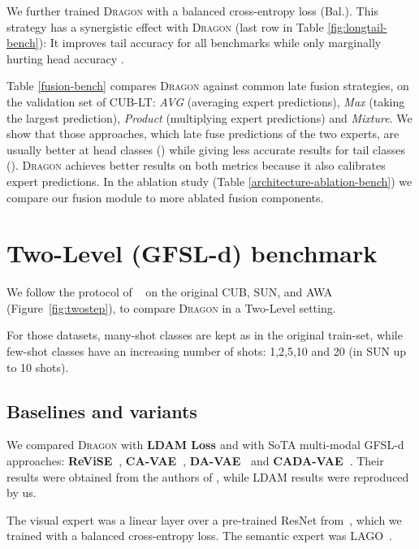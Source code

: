\documentclass[10pt,twocolumn,letterpaper]{article}
\newcommand{\figref}[1]{Figure~\ref{#1}}
\newcommand{\DRAGON}{\textsc{Dragon}}
\newcommand{\TwoLevel}{Two-Level}
\begin{document}
We further trained \DRAGON{} with a balanced cross-entropy loss (Bal.). This strategy has a synergistic effect with \DRAGON{} (last row in Table \ref{fig:longtail-bench}): It improves tail accuracy  for all benchmarks while only marginally hurting head accuracy .
 
Table \ref{fusion-bench}  compares \DRAGON{} against common late fusion strategies, on the validation set of CUB-LT:  \textit{AVG} (averaging expert predictions), \textit{Max} (taking the largest prediction), \textit{Product} (multiplying expert predictions) and \textit{Mixture}.
We show that those approaches, which late fuse predictions of the two experts, are usually better at head classes () while giving less accurate results for tail classes (). \DRAGON{} achieves better results on both metrics because it also calibrates expert predictions. In the ablation study (Table \ref{architecture-ablation-bench}) we compare our fusion module to more ablated fusion components.


\section{\TwoLevel{} (GFSL-d) benchmark}
\label{sec:two-level}

We follow the protocol of ~\cite{Schnfeld2019GeneralizedZL} on the original CUB, SUN, and AWA (\figref{fig:twostep}), to compare \DRAGON{} in a \TwoLevel{} setting.

For those datasets, many-shot classes are kept as in the original train-set, while few-shot classes have an increasing number of shots: 1,2,5,10 and 20 (in SUN up to 10 shots).

\subsection{Baselines and variants}
We compared \DRAGON{} with \textbf{LDAM Loss \cite{cao2019learning}} and with SoTA multi-modal GFSL-d  approaches: 
\textbf{ReViSE~\cite{REVISE}}, \textbf{CA-VAE~\cite{Schnfeld2019GeneralizedZL}},
\textbf{DA-VAE~\cite{Schnfeld2019GeneralizedZL}} and
\textbf{CADA-VAE~\cite{Schnfeld2019GeneralizedZL}}. Their results were obtained from the authors of \cite{Schnfeld2019GeneralizedZL}, while LDAM results were reproduced by us.

The visual expert was a linear layer over a pre-trained ResNet from~\cite{xianCVPR,xian_awa2}, which we trained with a balanced cross-entropy loss. The semantic expert was LAGO~\cite{LAGO}.
\end{document}
